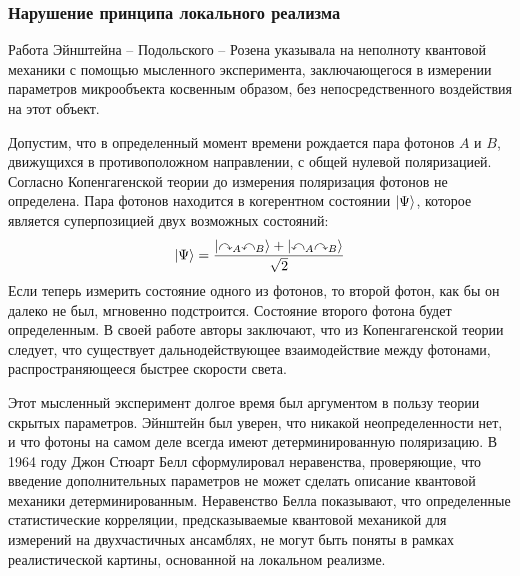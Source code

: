 
\subsubsection{Нарушение принципа локального реализма}
Работа Эйнштейна -- Подольского -- Розена\cite{Einstein1935}
указывала на неполноту квантовой механики с помощью мысленного эксперимента, 
заключающегося в измерении параметров микрообъекта косвенным образом,
без непосредственного воздействия на этот объект.

Допустим, что в определенный момент времени рождается пара фотонов $A$ и $B$,
движущихся в противоположном направлении, 
с общей нулевой поляризацией. 
Согласно Копенгагенской теории до измерения поляризация фотонов не определена.
Пара фотонов находится в когерентном состоянии $\left| \Psi \right\rangle$, 
которое является суперпозицией двух возможных состояний: 
\begin{equation}\label{eq:entangled-state}
  \left| \Psi \right\rangle = \dfrac{
    \left| \curvearrowright_A \curvearrowleft_B \right\rangle 
    + \left| \curvearrowleft_A \curvearrowright_B \right\rangle 
  }{\sqrt{2}}
\end{equation}
Если теперь измерить состояние одного из фотонов, 
то второй фотон, 
как бы он далеко не был, 
мгновенно подстроится.
Состояние второго фотона будет определенным. 
В своей работе\cite{Einstein1935} авторы заключают, 
что из Копенгагенской теории следует, 
что существует дальнодействующее взаимодействие между фотонами,
распространяющееся быстрее скорости света. 

Этот мысленный эксперимент долгое время был аргументом 
в пользу теории скрытых параметров. 
Эйнштейн был уверен, 
что никакой неопределенности нет, 
и что фотоны на самом деле всегда имеют детерминированную поляризацию. 
В 1964 году Джон Стюарт Белл сформулировал неравенства\cite{Bell1964},
проверяющие, 
что введение дополнительных параметров не может сделать описание квантовой механики детерминированным.  
Неравенство Белла показывают, 
что определенные статистические корреляции, 
предсказываемые квантовой механикой для измерений на двухчастичных ансамблях,
не могут быть поняты в рамках реалистической картины, 
основанной на локальном реализме\cite{Einstein1935}.


